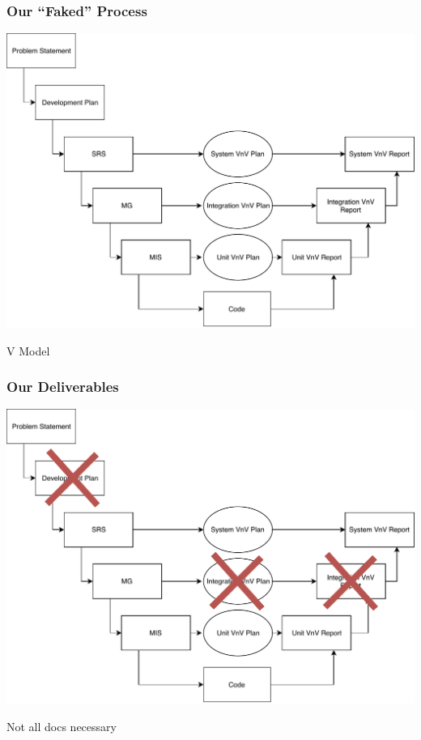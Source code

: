 \documentclass[t,12pt,numbers,fleqn]{beamer}
\begin{document}
\begin{frame}

\frametitle{Our ``Faked'' Process}

\begin{center}
\includegraphics[scale=0.55]{../Figures/VModelOfProcess.pdf}
\end{center}
\vspace{-1.0cm}
V Model

\end{frame}


\begin{frame}

\frametitle{Our Deliverables}

\begin{center}
\includegraphics[scale=0.55]{../Figures/VModelOfProcessXOut.pdf}
\end{center}
\vspace{-1.0cm}
Not all docs necessary

\end{frame}
\end{document}
